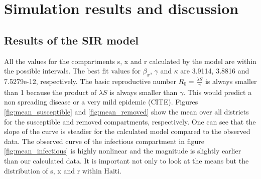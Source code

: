 \documentclass[11pt]{article}
\begin{document}
\section{Simulation results and discussion}
\subsection{Results of the SIR model}
All the values for the compartments s, x and r calculated by the model are within the possible intervals. The best fit values for $\beta_{x}$, $\gamma$ and $\kappa$ are 3.9114, 3.8816 and 7.5279e-12, respectively. The basic reproductive number $R_{0} = \frac{\lambda S}{\gamma}$ is always smaller than 1 because the product of $\lambda S$ is always smaller than $\gamma$. This would predict a non spreading disease or a very mild epidemic (CITE). Figures \ref{fig:mean_susceptible} and \ref{fig:mean_removed} show the mean over all districts for the susceptible and removed compartments, respectively. One can see that the slope of the curve is steadier for the calculated model compared to the observed data. The observed curve of the infectious compartment in figure \ref{fig:mean_infectious} is highly nonlinear and the magnitude is slightly earlier than our calculated data. It is important not only to look at the means but the distribution of s, x and r within Haiti.\\
\end{document}
